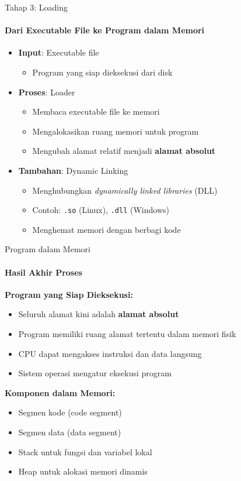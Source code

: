 \documentclass[10pt,aspectratio=169]{beamer}
\begin{document}
\begin{frame}{Tahap 3: Loading}
    \framesubtitle{Dari Executable File ke Program dalam Memori}
    
    \begin{itemize}
        \item \textbf{Input}: Executable file
        \begin{itemize}
            \item Program yang siap dieksekusi dari disk
        \end{itemize}
        
        \item \textbf{Proses}: Loader
        \begin{itemize}
            \item Membaca executable file ke memori
            \item Mengalokasikan ruang memori untuk program
            \item Mengubah alamat relatif menjadi \textbf{alamat absolut}
        \end{itemize}
        
        \item \textbf{Tambahan}: Dynamic Linking
        \begin{itemize}
            \item Menghubungkan \textit{dynamically linked libraries} (DLL)
            \item Contoh: \texttt{.so} (Linux), \texttt{.dll} (Windows)
            \item Menghemat memori dengan berbagi kode
        \end{itemize}
    \end{itemize}
\end{frame}

\begin{frame}{Program dalam Memori}
    \framesubtitle{Hasil Akhir Proses}
    
    \textbf{Program yang Siap Dieksekusi:}
    \begin{itemize}
        \item Seluruh alamat kini adalah \textbf{alamat absolut}
        \item Program memiliki ruang alamat tertentu dalam memori fisik
        \item CPU dapat mengakses instruksi dan data langsung
        \item Sistem operasi mengatur eksekusi program
    \end{itemize}
    
    \textbf{Komponen dalam Memori:}
    \begin{itemize}
        \item Segmen kode (code segment)
        \item Segmen data (data segment)
        \item Stack untuk fungsi dan variabel lokal
        \item Heap untuk alokasi memori dinamis
    \end{itemize}
\end{frame}
\end{document}
